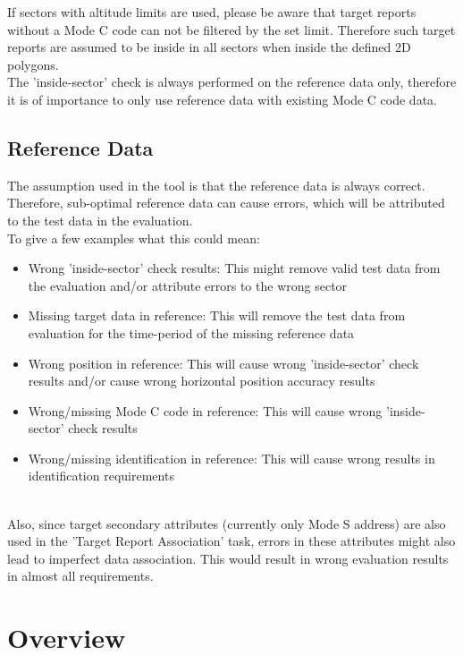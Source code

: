 If sectors with altitude limits are used, please be aware that target reports without a Mode C code can not be filtered by the set limit. Therefore such target reports are assumed to be inside in all sectors when inside the defined 2D polygons. \\

The 'inside-sector' check is always performed on the reference data only, therefore it is of importance to only use reference data with existing Mode C code data.

\subsection{Reference Data}

The assumption used in the tool is that the reference data is always correct. Therefore, sub-optimal reference data can cause errors, which will be attributed to the test data in the evaluation. \\

To give a few examples what this could mean:
\begin{itemize}  
\item Wrong 'inside-sector' check results: This might remove valid test data from the evaluation and/or attribute errors to the wrong sector
\item Missing target data in reference: This will remove the test data from evaluation for the time-period of the missing reference data
\item Wrong position in reference: This will cause wrong 'inside-sector' check results and/or cause wrong horizontal position accuracy results
\item Wrong/missing Mode C code in reference: This will cause wrong 'inside-sector' check results
\item Wrong/missing identification in reference: This will cause wrong results in identification requirements
\end{itemize}
\ \\

Also, since target secondary attributes (currently only Mode S address) are also used in the 'Target Report Association' task, errors in these attributes might also lead to imperfect data association. This would result in wrong evaluation results in almost all requirements.

\section{Overview}
\label{sec:eval_overview} 

